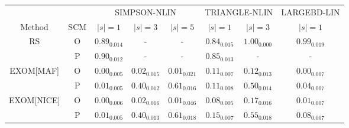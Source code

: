 
\label{tab:91}
\centering
\begin{tabular}{cccccccc}
    \toprule
    \multicolumn{2}{c}{} & \multicolumn{3}{c}{SIMPSON-NLIN} & \multicolumn{2}{c}{TRIANGLE-NLIN} & \multicolumn{1}{c}{LARGEBD-LIN}\\
    \cmidrule(r){3-5} \cmidrule(r){6-7} \cmidrule(r){8-8}
    Method & SCM & $|s|=1$ & $|s|=3$ & $|s|=5$ & $|s|=1$ & $|s|=3$ & $|s|=1$ \\
    \midrule
    \multirow{2}{*}{RS} & O & $0.89_{0.014}$ & - & - & $0.84_{0.015}$ & $1.00_{0.000}$ & $0.99_{0.019}$\\
    & P & $0.90_{0.012}$ & - & - & $0.85_{0.013}$ & - & -\\
    \midrule
    \multirow{2}{*}{EXOM[MAF]} & O & $0.00_{0.005}$ & $0.02_{0.015}$ & $0.01_{0.021}$ & $0.11_{0.007}$ & $0.12_{0.013}$ & $0.00_{0.007}$\\
    & P & $0.01_{0.005}$ & $0.40_{0.012}$ & $0.61_{0.016}$ & $0.11_{0.008}$ & $0.50_{0.014}$ & $0.04_{0.007}$\\
    \midrule
    \multirow{2}{*}{EXOM[NICE]} & O & $0.00_{0.006}$ & $0.02_{0.016}$ & $0.01_{0.046}$ & $0.08_{0.005}$ & $0.17_{0.016}$ & $0.01_{0.007}$\\
    & P & $0.01_{0.005}$ & $0.40_{0.013}$ & $0.61_{0.018}$ & $0.15_{0.007}$ & $0.55_{0.018}$ & $0.08_{0.007}$\\
    \bottomrule
\end{tabular}
